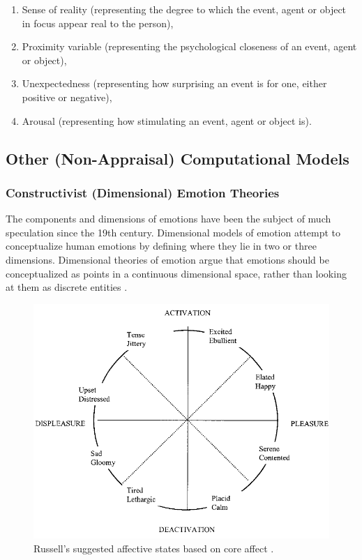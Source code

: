 \documentclass[12pt]{report}
\begin{document}
\begin{enumerate}
	\item Sense of reality (representing the degree to which the event, agent or
	object in focus appear real to the person),

	\item Proximity variable (representing the psychological closeness of an event,
	agent or object),

	\item Unexpectedness (representing how surprising an event is for one, either
	positive or negative),

	\item Arousal (representing how stimulating an event, agent or object is).
\end{enumerate}

\subsection{Other (Non-Appraisal) Computational Models}

\subsubsection{Constructivist (Dimensional) Emotion Theories}
\label{sec:dimensional-emotions}

The components and dimensions of emotions have been the subject of much
speculation since the 19th century. Dimensional models of emotion attempt to
conceptualize human emotions by defining where they lie in two or three
dimensions. Dimensional theories of emotion argue that emotions should be
conceptualized as points in a continuous dimensional space, rather than looking
at them as discrete entities \cite{carver:affect-behavior}
\cite{mehrabian-russell:pad} \cite{russell:core-affect}
\cite{watson:consensual-structure-mood}.

\begin{figure}[tbh]
  \center
  \includegraphics[width=.7\textwidth]{figure/core-affect.png}
  \caption{Russell's suggested affective states based on core affect
  \cite{russell:core-affect}.}
  \label{fig:core-affect}
\end{figure}
\end{document}
